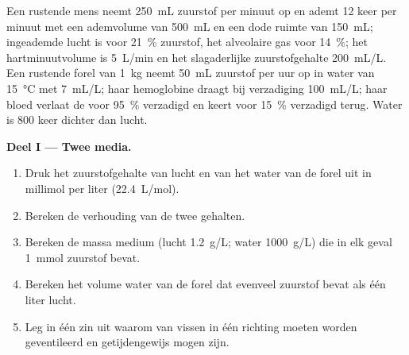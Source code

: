 \begin{problem}
\label{pb:b1:gas-exchange:1}
Een rustende mens neemt \qty{250}{mL} zuurstof per minuut op en ademt \qty{12}{}
keer per minuut met een ademvolume van \qty{500}{mL} en een dode ruimte van
\qty{150}{mL}; ingeademde lucht is voor \qty{21}{\%} zuurstof, het alveolaire gas
voor \qty{14}{\%}; het hartminuutvolume is \qty{5}{L/min} en het slagaderlijke
zuurstofgehalte \qty{200}{mL/L}. Een rustende forel van \qty{1}{kg} neemt
\qty{50}{mL} zuurstof per uur op in water van \qty{15}{\celsius} met \qty{7}{mL/L};
haar hemoglobine draagt bij verzadiging \qty{100}{mL/L}; haar bloed verlaat de
 voor \qty{95}{\%} verzadigd en keert voor \qty{15}{\%} verzadigd terug.
Water is \qty{800}{} keer dichter dan lucht.

\medskip
\noindent\textbf{Deel I --- Twee media.}
\begin{enumerate}
  \item Druk het zuurstofgehalte van lucht en van het water van de forel
        uit in millimol per liter (\qty{22.4}{L/mol}).
  \item Bereken de verhouding van de twee gehalten.
  \item Bereken de massa medium (lucht \qty{1.2}{g/L}; water
        \qty{1000}{g/L}) die in elk geval \qty{1}{mmol} zuurstof bevat.
  \item Bereken het volume water van de forel dat evenveel zuurstof bevat
        als één liter lucht.
  \item Leg in één zin uit waarom  van vissen in één richting
        moeten worden geventileerd en  getijdengewijs mogen zijn.
\end{enumerate}


\end{problem}
